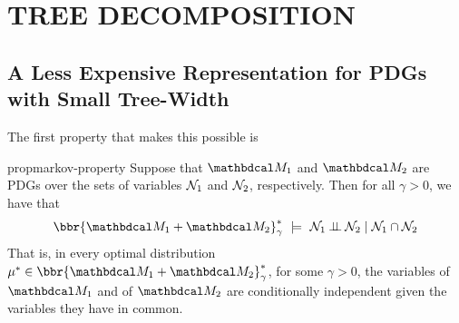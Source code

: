 \documentclass[twoside]{article}
\begin{document}




\section{TREE DECOMPOSITION }
\subsection{A Less Expensive Representation for PDGs with Small Tree-Width}
    \label{sec:clique-tree-expcone}

    The first property that makes this possible is 

\begin{linked}{prop}{markov-property}
    Suppose that $\dg M_1$ and $\dg M_2$ are PDGs
    over the sets of variables $\mathcal N_1$ and $\mathcal N_2$, respectively.
	Then for all $\gamma > 0$, we have that
	\[
	 	\bbr{\dg M_1 \bundle \dg M_2}^*_\gamma
			~\models~
		\N_1 \mathbin{\bot\!\!\!\bot} \N_2 \mid \N_1 \cap \N_2
	\]
	That is, in every optimal distribution $\mu^* \in
        \bbr{\dg M_1 \bundle \dg M_2}^*_\gamma$, 
      for some $\gamma>0$, 
    the variables of $\dg M_1$ and of $\dg M_2$ are conditionally independent given the variables they have in common.
\end{linked}
\end{document}
